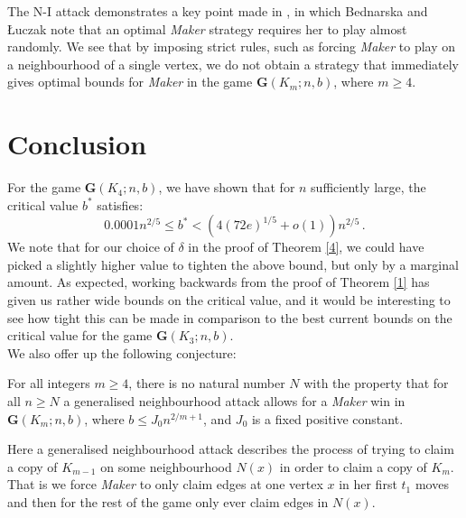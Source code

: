 \documentclass[a4paper,oneside,11pt]{report}
\begin{document}
The N-I attack demonstrates a key point made in \cite{bednarska2000biased}, in which Bednarska and {\L}uczak note that an optimal \textit{Maker} strategy requires her to play almost randomly. We see that by imposing strict rules, such as forcing \textit{Maker} to play on a neighbourhood of a single vertex, we do not obtain a strategy that immediately gives optimal bounds for \textit{Maker} in the game $\textbf{G}(K_m;n,b)$, where $m \geqslant 4$.

\chapter{Conclusion}

For the game $\textbf{G}(K_4;n,b)$, we have shown that for $n$ sufficiently large, the critical value $b^*$ satisfies:\[0.0001n^{2/5} \leqslant b^* < (4(72e)^{1/5}+o(1))n^{2/5}\,.\]We note that for our choice of $\delta$ in the proof of Theorem \ref{4}, we could have picked a slightly higher value to tighten the above bound, but only by a marginal amount. As expected, working backwards from the proof of Theorem \ref{1} has given us rather wide bounds on the critical value, and it would be interesting to see how tight this can be made in comparison to the best current bounds on the critical value for the game $\textbf{G}(K_3;n,b)$.\\

We also offer up the following conjecture:

\begin{conjecture}
    For all integers $m \geqslant 4$, there is no natural number $N$ with the property that for all $n \geqslant N$ a generalised neighbourhood attack allows for a \textit{Maker} win in $\textbf{G}(K_m;n,b)$, where $b \leqslant J_0n^{2/m+1}$, and $J_0$ is a fixed positive constant.
    
\end{conjecture}

Here a generalised neighbourhood attack describes the process of trying to claim a copy of $K_{m-1}$ on some neighbourhood $N(x)$ in order to claim a copy of $K_m$. That is we force \textit{Maker} to only claim edges at one vertex $x$ in her first $t_1$ moves and then for the rest of the game only ever claim edges in $N(x)$.\\
\end{document}
